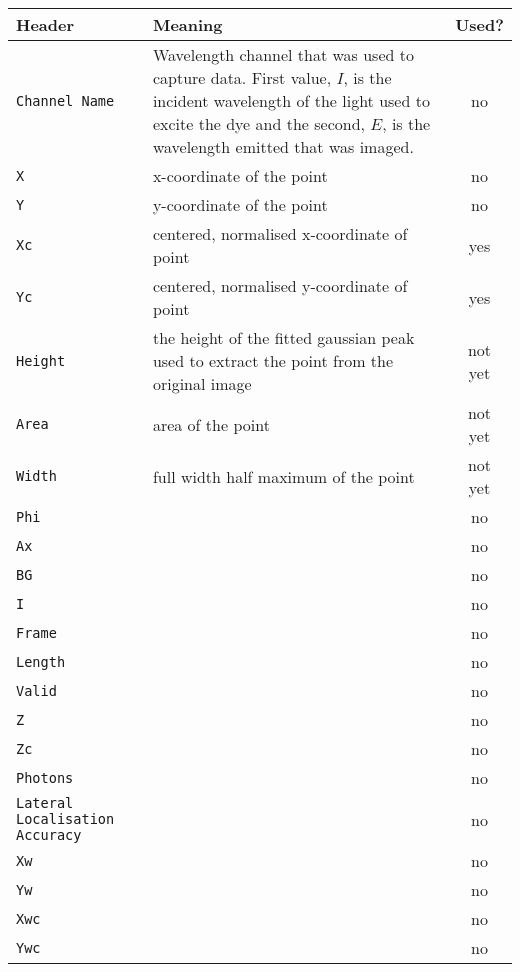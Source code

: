 \begin{center}
	\begin{tabu}{p{1.1cm} X c}
		\toprule
		Header & Meaning & Used? \\
		\midrule
		\texttt{Channel Name} & Wavelength channel that was used to capture data.
			First value, $I$, is the incident wavelength of the light used to
			excite the dye and the second, $E$, is the wavelength emitted that
			was imaged. & no \\
		\texttt{X} & x-coordinate of the point & no \\
		\texttt{Y} & y-coordinate of the point & no \\
		\texttt{Xc} & centered, normalised x-coordinate of point & yes \\
		\texttt{Yc} & centered, normalised y-coordinate of point & yes \\
		\texttt{Height} & the height of the fitted gaussian peak used to
			extract the point from the original image & not yet \\
		\texttt{Area} & area of the point & not yet \\
		\texttt{Width} & full width half maximum of the point & not yet \\
		\texttt{Phi}          &  & no \\
		\texttt{Ax}           &  & no \\
		\texttt{BG}           &  & no \\
		\texttt{I}            &  & no \\
		\texttt{Frame}        &  & no \\
		\texttt{Length}       &  & no \\
		\texttt{Valid}        &  & no \\
		\texttt{Z}            &  & no \\
		\texttt{Zc}           &  & no \\
		\texttt{Photons}      &  & no \\
		\texttt{Lateral Localisation Accuracy}     &  & no \\
		\texttt{Xw}           &  & no \\
		\texttt{Yw}           &  & no \\
		\texttt{Xwc}          &  & no \\
		\texttt{Ywc}          &  & no \\
		\bottomrule
	\end{tabu}
\end{center}
